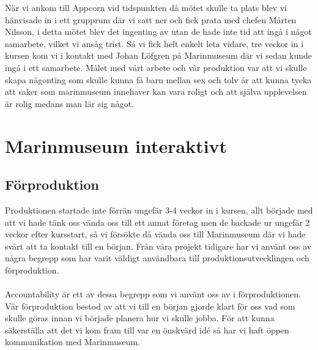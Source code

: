 \documentclass[12pt, titlepage]{article}
\begin{document}
När vi ankom till Appcorn vid tidspunkten då mötet skulle ta plats blev vi hänvisade 
in i ett grupprum där vi satt ner och fick prata med chefen Mårten Nilsson, 
i detta mötet blev det ingenting av utan de hade inte tid att ingå i något samarbete, 
vilket vi ansåg trist. Så vi fick helt enkelt leta vidare, tre veckor in i kursen kom vi 
i kontakt med Johan Löfgren på Marinmuseum där vi sedan kunde ingå i ett samarbete. 
Målet med vårt arbete och vår produktion var att vi skulle skapa någonting som skulle kunna 
få barn mellan sex och tolv år att kunna tycka att saker som marinmuseum innehaver kan vara 
roligt och att själva upplevelsen är rolig medans man lär sig något.

\section{Marinmuseum interaktivt}
\subsection{Förproduktion}
Produktionen startade inte förrän ungefär 3-4 veckor in i kursen, allt började med att vi hade 
tänk oss vända oss till ett annat företag men de backade ur ungefär 2 veckor efter kursstart, 
så vi försökte då vända oss till Marinmuseum där vi hade svårt att ta kontakt till en början.	
Från våra projekt tidigare har vi använt oss av några begrepp som har varit väldigt användbara till 
produktionsutvecklingen och förproduktion. 
\\
\\
Accountability är ett av dessa begrepp som vi använt oss av i förproduktionen. 
Vår förproduktion bestod av att vi till en början gjorde klart för oss vad som skulle göras innan vi började 
planera hur vi skulle jobba. För att kunna säkerställa att det vi kom fram till var en önskvärd idé 
så har vi haft öppen kommunikation med Marinmuseum. 
\end{document}
